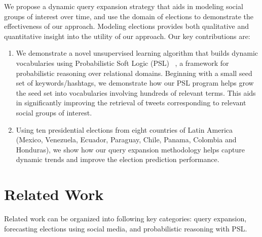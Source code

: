 We propose a dynamic query expansion strategy that aids in modeling social groups of interest over time, and
use the domain of elections to demonstrate the effectiveness of our approach. Modeling elections provides both
qualitative and quantitative insight into the utility of our approach.
Our key contributions are:
\begin{enumerate}
\item We demonstrate
a novel unsupervised learning algorithm that builds dynamic vocabularies using Probabilistic Soft Logic (PSL) ~\cite{kimmig2012short}, a framework for probabilistic reasoning over relational domains.
Beginning with a small seed set of keywords/hashtags, we demonstrate how our PSL program helps
grow the seed set into 
vocabularies involving hundreds of relevant terms. This aids in significantly improving the retrieval of tweets
corresponding to relevant
social groups of interest.
\item Using ten presidential elections from eight countries of Latin America (Mexico, Venezuela, Ecuador, Paraguay, Chile, Panama, Colombia and Honduras), we show how our query expansion methodology helps capture dynamic trends and improve the election prediction performance. 
\begin{comment}
\item In addition to qualitative understanding of social groups, we demonstrate how our approach yields
appreciable improvements to the forecasting of election outcomes. By regressing against opinion polls in each region,
we illustrate how better social group modeling reveals popularities of candidates and their policies.
\end{comment}
\end{enumerate}

\section{Related Work}
Related work can be organized into following key categories: query expansion, forecasting elections using social media,
and probabilistic reasoning with PSL.
\begin{comment}
\reviews{refer\\
Dongsheng Duan, Yuhua Li, Ruixuan Li, Rui Zhang, and Aiming Wen. 2012. RankTopic: Ranking Based Topic Modeling. In Proceedings of the 2012 IEEE 12th International Conference on Data Mining (ICDM 12) [This work also captures relational information] ; Daniel Ramage, Susan T. Dumais, and Daniel J. Liebling. ICWSM, The AAAI Press, (2010); Castella, Quim and Sutton, Charles A Word Storms: Multiples of Word Clouds for Visual Comparison of Documents. CoRR abs/1301.0503 (2013)\\
Lau, Jey Han, Nigel Collier and Timothy Baldwin (2012) On-line Trend Analysis with Topic Models: hashtag twitter trends detection topic model online, In Proceedings of the 24th International Conference on Computational Linguistics (COLING 2012)
}
\end{comment}

